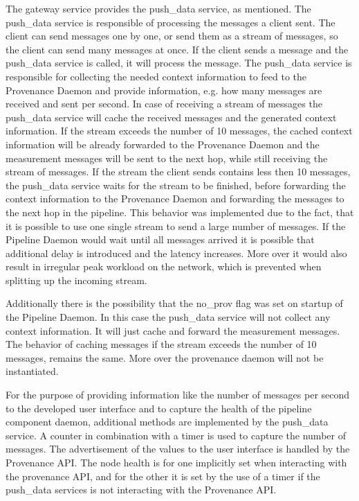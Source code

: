 The gateway service provides the push\_data service, as mentioned. The push\_data service is responsible of processing the messages a client sent. The client can send messages one by one, or send them as a stream of messages, so the client can send many messages at once. If the client sends a message and the push\_data service is called, it will process the message. The push\_data service is responsible for collecting the needed context information to feed to the Provenance Daemon and provide information, e.g. how many messages are received and sent per second. In case of receiving a stream of messages the push\_data service will cache the received messages and the generated context information. If the stream exceeds the number of 10 messages, the cached context information will be already forwarded to the Provenance Daemon and the measurement messages will be sent to the next hop, while still receiving the stream of messages. If the stream the client sends contains less then 10 messages, the push\_data service waits for the stream to be finished, before forwarding the context information to the Provenance Daemon and forwarding the messages to the next hop in the pipeline. This behavior was implemented due to the fact, that it is possible to use one single stream to send a large number of messages. If the Pipeline Daemon would wait until all messages arrived it is possible that additional delay is introduced and the latency increases. More over it would also result in irregular peak workload on the network, which is prevented when splitting up the incoming stream.   

Additionally there is the possibility that the no\_prov flag was set on startup of the Pipeline Daemon. In this case the push\_data service will not collect any context information. It will just cache and forward the measurement messages. 
The behavior of caching messages if the stream exceeds the number of 10 messages, remains the same. More over the provenance daemon will not be instantiated.

For the purpose of providing information like the number of messages per second to the developed user interface and to capture the health of the pipeline component daemon, additional methods are implemented by the push\_data service. A counter in combination with a timer is used to capture the number of messages. The advertisement of the values to the user interface is handled by the Provenance API. The node health is for one implicitly set when interacting with the provenance API, and for the other it is set by the use of a timer if the push\_data services is not interacting with the Provenance API.

